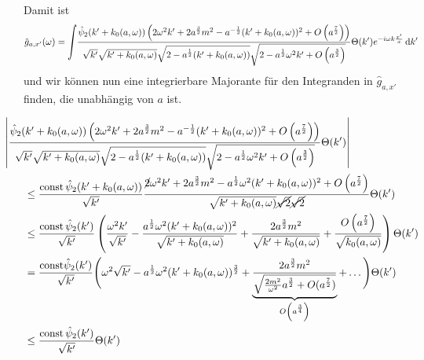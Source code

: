 Damit ist
\begin{equation}
    \hat g_{a,x'}(\omega) = \bigint \frac{
        \hat\psi_2(k'+k_0(a,\omega)) \left(
        2 \omega^2 k' + 2a^{\frac{3}{2}}m^2-a^{-\frac{1}{2}}(k'+k_0(a,\omega))^2
            + O \left(a^{\frac{7}{2}}\right)
        \right)
    }
    {
        \sqrt{k'} \sqrt{k'+k_0(a,\omega)} \sqrt{2-a^{\frac{1}{2}}(k'+k_0(a,\omega))}
        \sqrt{2-a^{\frac{1}{2}}\omega^2 k' + O\left(a^{\frac{3}{2}}\right)}
    }
    \Theta(k') e^{-i\omega k \frac{x'}{a}} \d k'
    \label{eq:ga(w)}
\end{equation}
und wir können nun eine integrierbare Majorante für den Integranden in \(\hat g_{a,x'}\) finden, die unabhängig von \(a\) ist.

\begin{align}
&\kern -2em
    \left|
    \frac{
        \hat\psi_2(k'+k_0(a,\omega)) \left(
        2 \omega^2 k' + 2a^{\frac{3}{2}}m^2-a^{-\frac{1}{2}}(k'+k_0(a,\omega))^2
            + O \left(a^{\frac{7}{2}}\right)
        \right)
    }
    {
        \sqrt{k'} \sqrt{k'+k_0(a,\omega)} \sqrt{2-a^{\frac{1}{2}}(k'+k_0(a,\omega))}
        \sqrt{2-a^{\frac{1}{2}}\omega^2 k' + O\left(a^{\frac{3}{2}}\right)}
    }
    \Theta(k')
    \right|
    \nonumber \\ &\leq
    \frac{\textrm{const}\,\hat\psi_2(k'+k_0(a,\omega))}{\sqrt{k'}}
    \frac{
        \cancel{2}\omega^2 k' + 2a^{\frac{3}{2}}m^2
        -a^{\frac{1}{2}} \omega^2 (k'+k_0(a,\omega))^2 + O\left(a^{\frac{7}{2}}\right)
    }
    {
        \sqrt{k' + k_0(a,\omega)}\cancel{\sqrt{2}} \cancel{\sqrt{2}}
    }\Theta(k')
    \nonumber \\ &\leq
    \frac{\textrm{const}\, \hat\psi_2(k')}{\sqrt{k'}}
    \left(
        \frac{\omega^2 k'}{\sqrt{k'}}
        - \frac{a^{\frac{1}{2}}\omega^2(k'+k_0(a,\omega))^2}{\sqrt{k'+k_0(a,\omega)}}
        + \frac{2a^{\frac{3}{2}}m^2}{\sqrt{k'+k_0(a,\omega)}}
        + \frac{O\left(a^{\frac{7}{2}}\right)}{\sqrt{k_0(a,\omega)}}
    \right)\Theta(k')
    \nonumber \\ &=
    \frac{\textrm{const} \hat\psi_2(k')}{\sqrt{k'}}
    \Bigg(
        \omega^2 \sqrt{k'} - a^{\frac{1}{2}}\omega^2 (k'+k_0(a,\omega))^{\frac{3}{2}}
        + \underbrace{\frac{2a^{\frac{3}{2}}m^2}
                    {\sqrt{\frac{2m^2}{\omega^2}a^{\frac{3}{2}}+O(a^{\frac{7}{2}})}}}_{O\left(a^{\frac{3}{4}}\right)}
        + \dots
    \Bigg)\Theta(k')
    \nonumber \\&\leq
    \frac{\textrm{const}\, \hat\psi_2(k')}{\sqrt{k'}}\Theta(k')
    \label{eq:lange_1/sqrt_abschaetzerei}
\end{align}
